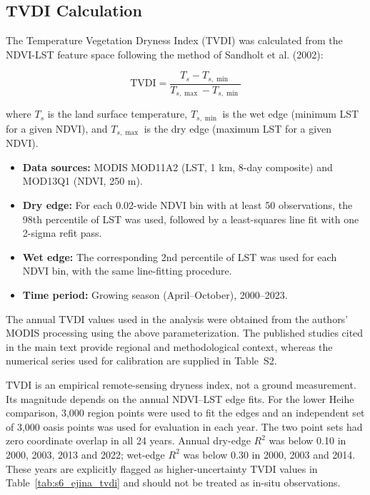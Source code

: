\documentclass[12pt,a4paper]{article}
\begin{document}
\subsection{TVDI Calculation}

The Temperature Vegetation Dryness Index (TVDI) was calculated from the NDVI-LST feature space following the method of Sandholt et al. (2002):

\begin{equation}
	\mathrm{TVDI} = \frac{T_s - T_{s,\min}}{T_{s,\max} - T_{s,\min}}
\end{equation}

where $T_s$ is the land surface temperature, $T_{s,\min}$ is the wet edge (minimum LST for a given NDVI), and $T_{s,\max}$ is the dry edge (maximum LST for a given NDVI).

\begin{itemize}
	\item \textbf{Data sources:} MODIS MOD11A2 (LST, 1 km, 8-day composite) and MOD13Q1 (NDVI, 250 m).
	\item \textbf{Dry edge:} For each 0.02-wide NDVI bin with at least 50 observations, the 98th percentile of LST was used, followed by a least-squares line fit with one 2-sigma refit pass.
	\item \textbf{Wet edge:} The corresponding 2nd percentile of LST was used for each NDVI bin, with the same line-fitting procedure.
	\item \textbf{Time period:} Growing season (April--October), 2000--2023.
\end{itemize}

The annual TVDI values used in the analysis were obtained from the authors'
MODIS processing using the above parameterization. The published studies cited
in the main text provide regional and methodological context, whereas the
numerical series used for calibration are supplied in Table~S2.

TVDI is an empirical remote-sensing dryness index, not a ground measurement. Its magnitude depends on the annual NDVI--LST edge fits. For the lower Heihe comparison, 3,000 region points were used to fit the edges and an independent set of 3,000 oasis points was used for evaluation in each year. The two point sets had zero coordinate overlap in all 24 years. Annual dry-edge $R^2$ was below 0.10 in 2000, 2003, 2013 and 2022; wet-edge $R^2$ was below 0.30 in 2000, 2003 and 2014. These years are explicitly flagged as higher-uncertainty TVDI values in Table~\ref{tab:s6_ejina_tvdi} and should not be treated as in-situ observations.
\end{document}

